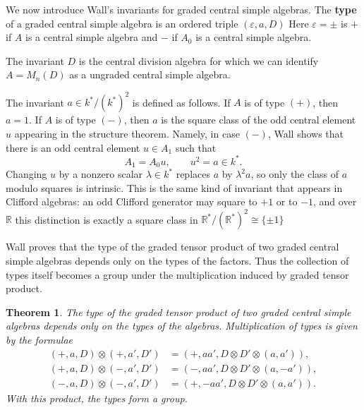 \documentclass{amsart}
\numberwithin{equation}{section}
\theoremstyle{plain} %
\newtheorem{theorem}[equation]{Theorem}
\theoremstyle{definition}
\theoremstyle{remark}
\begin{document}
We now introduce Wall's invariants for graded central simple algebras. The \textbf{type} of a graded central simple algebra is an ordered triple $(\varepsilon,a,D)$
Here $\varepsilon=\pm$ is $+$ if $A$ is a central simple algebra and $-$ if $A_0$ is a central simple algebra. 

The invariant $D$ is the central division algebra for which we can identify $A = M_n(D)$ as a ungraded central simple algebra. 

The invariant $a\in k^*/(k^*)^2$ is defined as follows. If $A$ is of type $(+)$, then $a=1$. If $A$ is of type $(-)$, then $a$ is the square class of the odd central element $u$ appearing in the structure theorem.
Namely, in case $(-)$, Wall shows that there is an odd central element $u\in A_1$ such that
\[
    A_1=A_0u,
    \qquad
    u^2=a\in k^*.
\]
Changing $u$ by a nonzero scalar $\lambda\in k^*$ replaces $a$ by $\lambda^2 a$, so only the class of $a$ modulo squares is intrinsic. This is the same kind of invariant that appears in Clifford algebras: an odd Clifford generator may square to $+1$ or to $-1$, and over $\mathbb R$ this distinction is exactly a square class in $\mathbb R^*/(\mathbb R^*)^2\cong \{\pm 1\}$

Wall proves that the type of the graded tensor product of two graded central simple algebras depends only on the types of the factors. Thus the collection of types itself becomes a group under the multiplication induced by graded tensor product. 


 
\begin{theorem}
    The type of the graded tensor product of two graded central simple algebras depends only on the types of the algebras. Multiplication of types is given by the formulae
    \begin{align*}
        (+,a,D)\otimes (+,a',D')
        &= (+,aa',D\otimes D'\otimes (a,a')), \\
        (+,a,D)\otimes (-,a',D')
        &= (-,aa',D\otimes D'\otimes (a,-a')), \\
        (-,a,D)\otimes (-,a',D')
        &= (+,-aa',D\otimes D'\otimes (a,a')).
    \end{align*}
    With this product, the types form a group.
\end{theorem}
\end{document}
